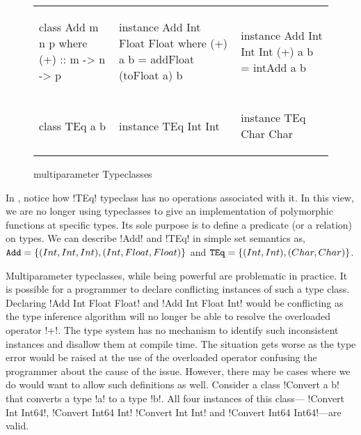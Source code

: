 \documentclass[format=sigplan,manuscript,review,screen, nonacm]{acmart}
\begin{document}
\begin{figure}[ht]
  \begin{tabular}{l l l}
    \begin{code}
class Add m n p where
  (+) :: m -> n -> p
    \end{code}&%
    \begin{code}
instance Add Int Float Float where
  (+) a b = addFloat (toFloat a) b
    \end{code}&%
    \begin{code}
instance Add Int Int Int
  (+) a b = intAdd a b
    \end{code}\\
    \begin{code}
class TEq a b
    \end{code}&%
    \begin{code}
instance TEq Int Int
    \end{code}&%
    \begin{code}
instance TEq Char Char
    \end{code}
  \end{tabular}
  \caption{multiparameter Typeclasses}
  \label{fig:multip-typeclass}
\end{figure}
In , notice how !TEq! typeclass has no operations associated with it.
In this view, we are no longer using typeclasses to give an implementation of polymorphic
functions at specific types. Its sole purpose is to define a predicate (or a relation) on types. 
We can describe !Add! and !TEq! in simple set semantics as, $\texttt{Add} = \{(Int, Int, Int), (Int, Float, Float)\}$
and $\texttt{TEq} = \{(Int, Int),(Char, Char)\}$.

Multiparameter typeclasses, while being powerful are problematic in practice.
It is possible for a programmer to declare conflicting instances of such a type class.
Declaring !Add Int Float Float! and !Add Int Float Int!
would be conflicting as the type inference algorithm will no longer be able to resolve
the overloaded operator !+!. The type system has no mechanism
to identify such inconsistent instances and disallow them at compile time. The situation gets worse
as the type error would be raised at the use of the overloaded operator confusing the programmer about the
cause of the issue. However, there may be cases where we do would want to allow such definitions as well.
Consider a class !Convert a b! that converts a type !a! to a type !b!. All four instances of this class---
!Convert Int Int64!, !Convert Int64 Int! !Convert Int Int! and !Convert Int64 Int64!---are valid.
\end{document}
